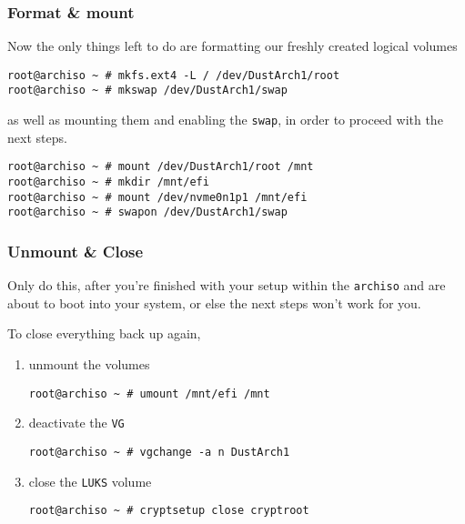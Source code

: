 \documentclass[10pt]{dustdoc}
\begin{document}
\subsubsection{Format \& mount}
\label{sec:format-and-mount}

Now the only things left to do are formatting our freshly created logical volumes

\begin{verbatim}
root@archiso ~ # mkfs.ext4 -L / /dev/DustArch1/root
root@archiso ~ # mkswap /dev/DustArch1/swap
\end{verbatim}

\noindent
as well as mounting them and enabling the \texttt{swap}, in order to proceed with the next steps.

\begin{verbatim}
root@archiso ~ # mount /dev/DustArch1/root /mnt
root@archiso ~ # mkdir /mnt/efi
root@archiso ~ # mount /dev/nvme0n1p1 /mnt/efi
root@archiso ~ # swapon /dev/DustArch1/swap
\end{verbatim}

\subsubsection{Unmount \& Close}
\label{sec:unmount-and-close}

\begin{WARNING}
    Only do this, after you’re finished with your setup within the \texttt{archiso} and are about to boot into your system, or else the next steps won’t work for you.
\end{WARNING}

To close everything back up again,

\begin{enumerate}
    \item unmount the volumes

        \begin{verbatim}
root@archiso ~ # umount /mnt/efi /mnt
        \end{verbatim}

    \item deactivate the \texttt{VG}

        \begin{verbatim}
root@archiso ~ # vgchange -a n DustArch1
        \end{verbatim}

    \item close the \texttt{LUKS} volume

        \begin{verbatim}
root@archiso ~ # cryptsetup close cryptroot
        \end{verbatim}
\end{enumerate}
\end{document}
